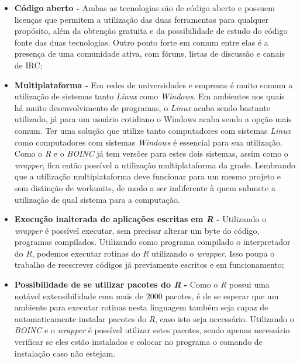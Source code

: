 \begin{itemize}
  \item \textbf{Código aberto -} Ambas as tecnologias são de código aberto e possuem licenças que permitem a utilização das duas
ferramentas para qualquer propósito, além da obtenção gratuita e da possibilidade de estudo do código fonte das duas tecnologias.
Outro ponto forte em comum entre elas é a presença de uma comunidade ativa, com fóruns, listas de discussão e canais de IRC;
  \item \textbf{Multiplataforma -}  Em redes de universidades e empresas é muito comum a utilização de sistemas tanto 
\emph{Linux} como \emph{Windows}. Em ambientes nos quais há muito desenvolvimento de programas, o \emph{Linux} acaba
sendo bastante utilizado, já para um usuário cotidiano o Windows acaba sendo a opção mais comum. Ter uma solução
que utilize tanto computadores com sistemas \emph{Linux} como computadores com sistemas \emph{Windows} é essencial 
para sua utilização. Como o \emph{R} e o \emph{BOINC} já tem versões para estes dois sistemas, assim como o \emph{wrapper}, 
fica então possível a utilização multiplataforma da grade. Lembrando que a utilização multiplataforma deve funcionar para um mesmo
projeto e sem distinção de workunits, de modo a ser indiferente à quem submete a utilização de qual sistema para a computação.
  \item \textbf{Execução inalterada de aplicações escritas em \emph{R} -} Utilizando o \emph{wrapper} é possível executar,
sem precisar alterar um byte do código, programas compilados. Utilizando como programa compilado o interpretador do 
\emph{R}, podemos executar rotinas do \emph{R} utilizando o \emph{wrapper}. Isso poupa o trabalho de reescrever
códigos já previamente escritos e em funcionamento;
  \item \textbf{Possibilidade de se utilizar pacotes do \emph{R} -} Como o \emph{R} possui uma notável extensibilidade com mais
de $2000$ pacotes, é de se esperar que um ambiente para executar rotinas nesta linguagem também seja capaz de automaticamente instalar
pacotes do \emph{R}, caso isto seja necessário. Utilizando o \emph{BOINC} e o \emph{wrapper} é possível utilizar estes pacotes,
sendo apenas necessário verificar se eles estão instalados e colocar no programa o comando de instalação caso não estejam.
\end{itemize}

